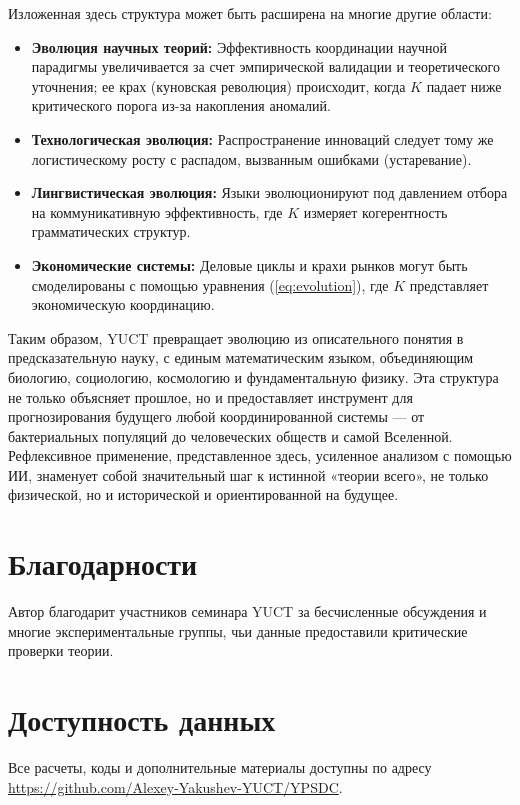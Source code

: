 \documentclass[12pt,a4paper]{article}
\theoremstyle{remark}
\begin{document}
	Изложенная здесь структура может быть расширена на многие другие области:
	\begin{itemize}
		\item \textbf{Эволюция научных теорий:} Эффективность координации научной парадигмы увеличивается за счет эмпирической валидации и теоретического уточнения; ее крах (куновская революция) происходит, когда $K$ падает ниже критического порога из-за накопления аномалий.
		\item \textbf{Технологическая эволюция:} Распространение инноваций следует тому же логистическому росту с распадом, вызванным ошибками (устаревание).
		\item \textbf{Лингвистическая эволюция:} Языки эволюционируют под давлением отбора на коммуникативную эффективность, где $K$ измеряет когерентность грамматических структур.
		\item \textbf{Экономические системы:} Деловые циклы и крахи рынков могут быть смоделированы с помощью уравнения (\ref{eq:evolution}), где $K$ представляет экономическую координацию.
	\end{itemize}
	
	Таким образом, YUCT превращает эволюцию из описательного понятия в предсказательную науку, с единым математическим языком, объединяющим биологию, социологию, космологию и фундаментальную физику. Эта структура не только объясняет прошлое, но и предоставляет инструмент для прогнозирования будущего любой координированной системы — от бактериальных популяций до человеческих обществ и самой Вселенной. Рефлексивное применение, представленное здесь, усиленное анализом с помощью ИИ, знаменует собой значительный шаг к истинной «теории всего», не только физической, но и исторической и ориентированной на будущее.
	
	\section*{Благодарности}
	
	Автор благодарит участников семинара YUCT за бесчисленные обсуждения и многие экспериментальные группы, чьи данные предоставили критические проверки теории.
	
	\section*{Доступность данных}
	
	Все расчеты, коды и дополнительные материалы доступны по адресу \url{https://github.com/Alexey-Yakushev-YUCT/YPSDC}.
	
\end{document}
